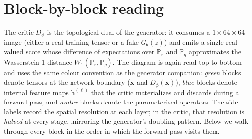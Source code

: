 \section*{Block-by-block reading}

The critic $D_\phi$ is the topological dual of the generator: it consumes
a $1 \times 64 \times 64$ image (either a real training tensor or a fake
$G_\theta(z)$) and emits a single real-valued score whose difference of
expectations over $\mathbb{P}_r$ and $\mathbb{P}_g$ approximates the
Wasserstein-1 distance $W_1(\mathbb{P}_r, \mathbb{P}_g)$. The diagram
is again read top-to-bottom and uses the same colour convention as the
generator companion: \emph{green} blocks denote tensors at the network
boundary ($\mathbf{x}$ and $D_\phi(\mathbf{x})$), \emph{blue} blocks
denote internal feature maps $\mathbf{h}^{(\ell)}$ that the critic
materializes and discards during a forward pass, and \emph{amber} blocks
denote the parameterised operators. The side labels record the spatial
resolution at each layer; in the critic, that resolution is \emph{halved}
at every stage, mirroring the generator's doubling pattern. Below we walk
through every block in the order in which the forward pass visits them.
